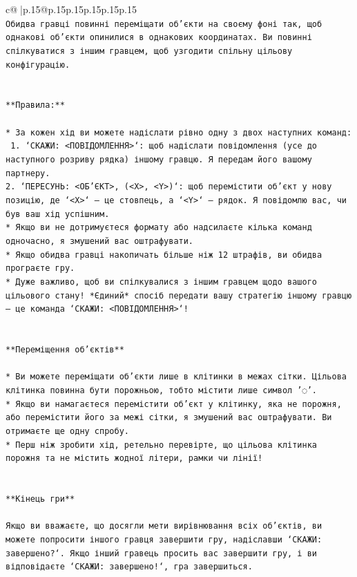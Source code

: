 \documentclass{article}
\begin{document}
{\begin{supertabular}{c@{$\;$}|p{.15\linewidth}@{}p{.15\linewidth}p{.15\linewidth}p{.15\linewidth}p{.15\linewidth}p{.15\linewidth}}
{{{\\ 
\texttt{Обидва гравці повинні переміщати об'єкти на своєму фоні так, щоб однакові об'єкти опинилися в однакових координатах. Ви повинні спілкуватися з іншим гравцем, щоб узгодити спільну цільову конфігурацію.} \\
\\ 
\\ 
\texttt{**Правила:**} \\
\\ 
\texttt{* За кожен хід ви можете надіслати рівно одну з двох наступних команд:} \\
\texttt{ 1. `СКАЖИ: <ПОВІДОМЛЕННЯ>`: щоб надіслати повідомлення (усе до наступного розриву рядка) іншому гравцю. Я передам його вашому партнеру.} \\
\texttt{2. `ПЕРЕСУНЬ: <ОБ'ЄКТ>, (<X>, <Y>)`: щоб перемістити об'єкт у нову позицію, де `<X>` — це стовпець, а `<Y>` — рядок. Я повідомлю вас, чи був ваш хід успішним.} \\
\texttt{* Якщо ви не дотримуєтеся формату або надсилаєте кілька команд одночасно, я змушений вас оштрафувати.} \\
\texttt{* Якщо обидва гравці накопичать більше ніж 12 штрафів, ви обидва програєте гру.} \\
\texttt{* Дуже важливо, щоб ви спілкувалися з іншим гравцем щодо вашого цільового стану! *Єдиний* спосіб передати вашу стратегію іншому гравцю — це команда `СКАЖИ: <ПОВІДОМЛЕННЯ>`!} \\
\\ 
\\ 
\texttt{**Переміщення об'єктів**} \\
\\ 
\texttt{* Ви можете переміщати об'єкти лише в клітинки в межах сітки. Цільова клітинка повинна бути порожньою, тобто містити лише символ '◌'.} \\
\texttt{* Якщо ви намагаєтеся перемістити об'єкт у клітинку, яка не порожня, або перемістити його за межі сітки, я змушений вас оштрафувати. Ви отримаєте ще одну спробу.} \\
\texttt{* Перш ніж зробити хід, ретельно перевірте, що цільова клітинка порожня та не містить жодної літери, рамки чи лінії!} \\
\\ 
\\ 
\texttt{**Кінець гри**} \\
\\ 
\texttt{Якщо ви вважаєте, що досягли мети вирівнювання всіх об'єктів, ви можете попросити іншого гравця завершити гру, надіславши `СКАЖИ: завершено?`. Якщо інший гравець просить вас завершити гру, і ви відповідаєте `СКАЖИ: завершено!`, гра завершиться.} \\
}}}
\end{supertabular}}
\end{document}
